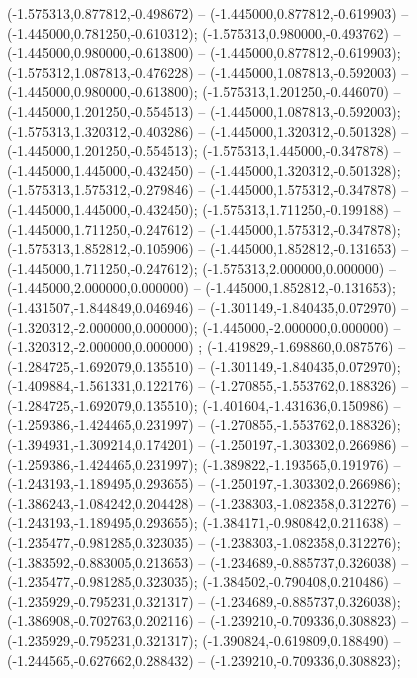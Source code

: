  (-1.575313,0.877812,-0.498672) -- (-1.445000,0.877812,-0.619903) -- (-1.445000,0.781250,-0.610312);
 (-1.575313,0.980000,-0.493762) -- (-1.445000,0.980000,-0.613800) -- (-1.445000,0.877812,-0.619903);
 (-1.575312,1.087813,-0.476228) -- (-1.445000,1.087813,-0.592003) -- (-1.445000,0.980000,-0.613800);
 (-1.575313,1.201250,-0.446070) -- (-1.445000,1.201250,-0.554513) -- (-1.445000,1.087813,-0.592003);
 (-1.575313,1.320312,-0.403286) -- (-1.445000,1.320312,-0.501328) -- (-1.445000,1.201250,-0.554513);
 (-1.575313,1.445000,-0.347878) -- (-1.445000,1.445000,-0.432450) -- (-1.445000,1.320312,-0.501328);
 (-1.575313,1.575312,-0.279846) -- (-1.445000,1.575312,-0.347878) -- (-1.445000,1.445000,-0.432450);
 (-1.575313,1.711250,-0.199188) -- (-1.445000,1.711250,-0.247612) -- (-1.445000,1.575312,-0.347878);
 (-1.575313,1.852812,-0.105906) -- (-1.445000,1.852812,-0.131653) -- (-1.445000,1.711250,-0.247612);
 (-1.575313,2.000000,0.000000) -- (-1.445000,2.000000,0.000000) -- (-1.445000,1.852812,-0.131653);
 (-1.431507,-1.844849,0.046946) -- (-1.301149,-1.840435,0.072970) -- (-1.320312,-2.000000,0.000000);
 (-1.445000,-2.000000,0.000000) -- (-1.320312,-2.000000,0.000000) ;
 (-1.419829,-1.698860,0.087576) -- (-1.284725,-1.692079,0.135510) -- (-1.301149,-1.840435,0.072970);
 (-1.409884,-1.561331,0.122176) -- (-1.270855,-1.553762,0.188326) -- (-1.284725,-1.692079,0.135510);
 (-1.401604,-1.431636,0.150986) -- (-1.259386,-1.424465,0.231997) -- (-1.270855,-1.553762,0.188326);
 (-1.394931,-1.309214,0.174201) -- (-1.250197,-1.303302,0.266986) -- (-1.259386,-1.424465,0.231997);
 (-1.389822,-1.193565,0.191976) -- (-1.243193,-1.189495,0.293655) -- (-1.250197,-1.303302,0.266986);
 (-1.386243,-1.084242,0.204428) -- (-1.238303,-1.082358,0.312276) -- (-1.243193,-1.189495,0.293655);
 (-1.384171,-0.980842,0.211638) -- (-1.235477,-0.981285,0.323035) -- (-1.238303,-1.082358,0.312276);
 (-1.383592,-0.883005,0.213653) -- (-1.234689,-0.885737,0.326038) -- (-1.235477,-0.981285,0.323035);
 (-1.384502,-0.790408,0.210486) -- (-1.235929,-0.795231,0.321317) -- (-1.234689,-0.885737,0.326038);
 (-1.386908,-0.702763,0.202116) -- (-1.239210,-0.709336,0.308823) -- (-1.235929,-0.795231,0.321317);
 (-1.390824,-0.619809,0.188490) -- (-1.244565,-0.627662,0.288432) -- (-1.239210,-0.709336,0.308823);

